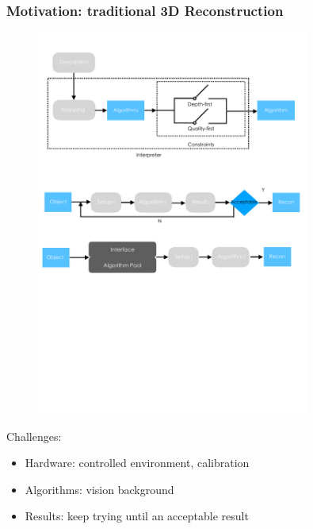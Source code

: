 \documentclass{beamer}
\begin{document}
\begin{frame}
\frametitle{Motivation: traditional 3D Reconstruction}

\begin{figure}
\centering
\includegraphics[width=0.8\textwidth]{images/traditional_3d_vision.pdf}
\end{figure}

Challenges:
\begin{itemize}
\item Hardware: controlled environment, calibration
\item Algorithms: vision background
\item Results: keep trying until an acceptable result
\end{itemize}

\end{frame}
\end{document}
